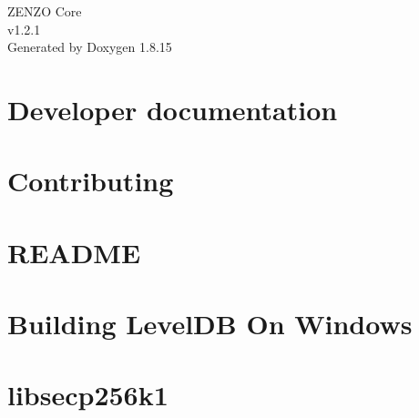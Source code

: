 \let\mypdfximage\pdfximage\def\pdfximage{\immediate\mypdfximage}\documentclass[twoside]{book}
\newcommand{\+}{\discretionary{\mbox{\scriptsize$\hookleftarrow$}}{}{}}
\newcommand{\clearemptydoublepage}{%
  \newpage{\pagestyle{empty}\cleardoublepage}%
}
\begin{document}
\hypersetup{pageanchor=false,
             bookmarksnumbered=true,
             pdfencoding=unicode
            }
\begin{titlepage}
\vspace*{7cm}
\begin{center}%
{\Large Z\+E\+N\+ZO Core \\[1ex]\large v1.\+2.\+1 }\\
\vspace*{1cm}
{\large Generated by Doxygen 1.8.15}\\
\end{center}
\end{titlepage}
\clearemptydoublepage
{}
\tableofcontents
\clearemptydoublepage
{}
\hypersetup{pageanchor=true}

\chapter{Developer documentation}
\label{index}\hypertarget{index}{}
\chapter{Contributing}
\label{md__d_1__documentz__git_hub__z_e_n_z_o-_core_src_leveldb__c_o_n_t_r_i_b_u_t_i_n_g}

\chapter{R\+E\+A\+D\+ME}
\label{md__d_1__documentz__git_hub__z_e_n_z_o-_core_src_leveldb__r_e_a_d_m_e}

\chapter{Building Level\+DB On Windows}
\label{md__d_1__documentz__git_hub__z_e_n_z_o-_core_src_leveldb__w_i_n_d_o_w_s}

\chapter{libsecp256k1}
\label{md__d_1__documentz__git_hub__z_e_n_z_o-_core_src_secp256k1__r_e_a_d_m_e}

\end{document}
